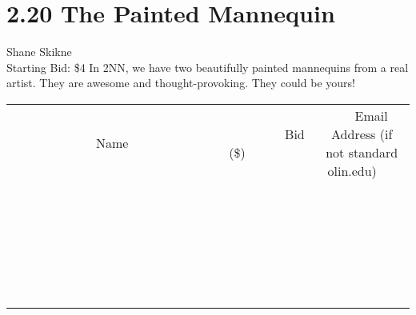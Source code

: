 \documentclass[11pt]{article}
\begin{document}
\section*{2.20 The Painted Mannequin}
Shane Skikne
\\
Starting Bid: \$4
\newline
In 2NN, we have two beautifully painted mannequins from a real artist. They are awesome and thought-provoking.  They could be yours!
\\[6ex]
\begin{tabular}{c c c}
~~~~~~~~~~~~~Name~~~~~~~~~~~~~ & ~~~~~~~~~Bid (\$)~~~~~~~~~  & ~~~Email Address (if not standard olin.edu)~~~\\
 & & \\
\hline
 & & \\
\hline
 & & \\
\hline
 & & \\
\hline
 & & \\
\hline
 & & \\
\hline
 & & \\
\hline
 & & \\
\hline
 & & \\
\hline
 & & \\
\hline
 & & \\
\hline
 & & \\
\hline
 & & \\
\hline
 & & \\
\hline
 & & \\
\hline
 & & \\
\hline
 & & \\
\hline
 & & \\
\hline
 & & \\
\hline
 & & \\
\hline
 & & \\
\hline
 & & \\
\hline
 & & \\
\hline
 & & \\
\hline
 & & \\
\hline
 & & \\
\hline
\end{tabular}
\newpage
\end{document}
